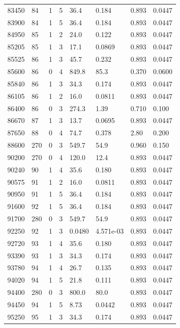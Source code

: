 \documentclass[preview]{standalone}
\begin{document}
{{{{{\begin{tabular}{L{1.2cm}C{1.2cm} C{0.3cm}C{0.5cm} C{1.4cm}C{1.4cm} C{1.4cm}C{1.4cm}}
  83450  &    84  & 1     &  5 &  36.4  & 0.184  & 0.893 &  0.0447   \\ 
  83900  &    84  & 1     &  5 &  36.4  & 0.184  & 0.893 &  0.0447   \\ 
  84950  &    85  & 1     &  2 &  24.0  & 0.122  & 0.893 &  0.0447   \\ 
  85205  &    85  & 1     &  3 &  17.1  & 0.0869  & 0.893 &  0.0447   \\ 
  85525  &    86  & 1     &  3 &  45.7  & 0.232  & 0.893 &  0.0447   \\ 
  85600  &    86  & 0     &  4 &  849.8  & 85.3  & 0.370 &  0.0600   \\ 
  85840  &    86  & 1     &  3 &  34.3  & 0.174  & 0.893 &  0.0447   \\ 
  86105  &    86  & 1     &  2 &  16.0  & 0.0811  & 0.893 &  0.0447   \\ 
  86400  &    86  & 0     &  3 &  274.3  & 1.39  & 0.710 &  0.100   \\ 
  86670  &    87  & 1     &  3 &  13.7  & 0.0695  & 0.893 &  0.0447   \\ 
  87650  &    88  & 0     &  4 &  74.7  & 0.378  & 2.80 &  0.200   \\ 
  88600  &   270  & 0     &  3 &  549.7  & 54.9  & 0.960 &  0.150   \\ 
  90200  &   270  & 0     &  4 &  120.0  & 12.4  & 0.893 &  0.0447   \\ 
  90240  &    90  & 1     &  4 &  35.6  & 0.180  & 0.893 &  0.0447   \\ 
  90575  &    91  & 1     &  2 &  16.0  & 0.0811  & 0.893 &  0.0447   \\ 
  90950  &    91  & 1     &  5 &  36.4  & 0.184  & 0.893 &  0.0447   \\ 
  91600  &    92  & 1     &  5 &  36.4  & 0.184  & 0.893 &  0.0447   \\ 
  91700  &   280  & 0     &  3 &  549.7  & 54.9  & 0.893 &  0.0447   \\ 
  92250  &    92  & 1     &  3 &  0.0480  & 4.571e-03  & 0.893 &  0.0447   \\ 
  92720  &    93  & 1     &  4 &  35.6  & 0.180  & 0.893 &  0.0447   \\ 
  93390  &    93  & 1     &  3 &  34.3  & 0.174  & 0.893 &  0.0447   \\ 
  93780  &    94  & 1     &  4 &  26.7  & 0.135  & 0.893 &  0.0447   \\ 
  94020  &    94  & 1     &  5 &  21.8  & 0.111  & 0.893 &  0.0447   \\ 
  94400  &   280  & 0     &  3 &  800.0  & 80.0  & 0.893 &  0.0447   \\ 
  94450  &    94  & 1     &  5 &  8.73  & 0.0442  & 0.893 &  0.0447   \\ 
  95250  &    95  & 1     &  3 &  34.3  & 0.174  & 0.893 &  0.0447   \\ 
\hline 
\end{tabular} 

}}}}}
\end{document}
